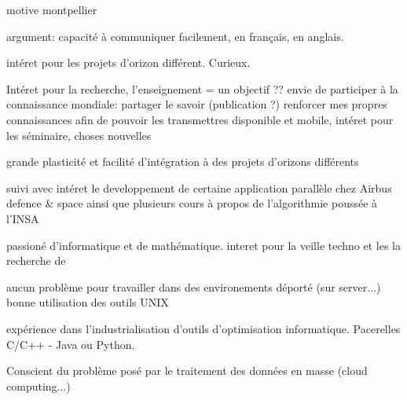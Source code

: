 motive montpellier

argument:
capacité à communiquer facilement, en français, en anglais.

intéret pour les projets d'orizon différent. Curieux.

Intéret pour la recherche, l'enseignement = un objectif ?? envie de participer à la connaissance mondiale: partager le savoir (publication ?) renforcer mes propres connaissances afin de pouvoir les transmettres
disponible et mobile, intéret pour les séminaire, choses nouvelles

grande plasticité et facilité d'intégration à des projets d'orizons différents

suivi avec intéret le developpement de certaine application parallèle chez Airbus defence & space
ainsi que plusieurs cours à propos de l'algorithmie poussée à l'INSA

passioné d'informatique et de mathématique. interet pour la veille techno et les la recherche de

aucun problème pour travailler dans des environements déporté (sur server...) bonne utilisation des outils UNIX

expérience dans l'industrialisation d'outils d'optimisation informatique. Pacerelles C/C++ - Java ou Python.

Conscient du problème posé par le traitement des données en masse (cloud computing...)
